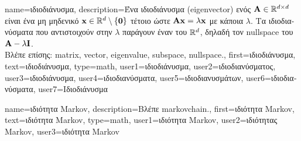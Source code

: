 {name={\foreignlanguage{greek}{ιδιοδιάνυσμα}}, 
	description={\foreignlanguage{greek}{Ένα ιδιοδιάνυσμα} (eigenvector) 
		\foreignlanguage{greek}{ενός}  ${\bf A} \in \mathbb{R}^{d \times d}$ 
		\foreignlanguage{greek}{είναι ένα μη μηδενικό}  ${\bf x} \in \mathbb{R}^{d} \setminus \{ \mathbf{0} \}$ 
		\foreignlanguage{greek}{τέτοιο ώστε $\mathbf{A} {\bf x} = \lambda {\bf x}$ με κάποια}  $\lambda$.
		\foreignlanguage{greek}{Τα ιδιοδιανύσματα που αντιστοιχούν στην}  $\lambda$ 
		\foreignlanguage{greek}{παράγουν έναν}  \foreignlanguage{greek}{του $\mathbb{R}^{d}$, δηλαδή τον} 
		\gls{nullspace} \foreignlanguage{greek}{του} ${\bf A}  - \lambda \mathbf{I}$.
		\\
		\foreignlanguage{greek}{Βλέπε επίσης:} \gls{matrix}, \gls{vector}, \gls{eigenvalue}, \gls{subspace}, \gls{nullspace}.},
	first={\foreignlanguage{greek}{ιδιοδιάνυσμα}},
	text={\foreignlanguage{greek}{ιδιοδιάνυσμα}},
	type=math,
	user1={\foreignlanguage{greek}{ιδιοδιάνυσμα}}, %
	user2={\foreignlanguage{greek}{ιδιοδιανύσματος}}, %
	user3={\foreignlanguage{greek}{ιδιοδιάνυσμα}}, %
	user4={\foreignlanguage{greek}{ιδιοδιανύσματα}}, %
	user5={\foreignlanguage{greek}{ιδιοδιανυσμάτων}}, %
	user6={\foreignlanguage{greek}{ιδιοδιανύσματα}}, %
	user7={\foreignlanguage{greek}{Ιδιοδιάνυσμα}} %
}

{name={\foreignlanguage{greek}{ιδιότητα} Markov},
	description={\foreignlanguage{greek}{Βλέπε} \gls{markovchain}.},
	first={\foreignlanguage{greek}{ιδιότητα} Markov},
	text={\foreignlanguage{greek}{ιδιότητα} Markov},
	type=math,
	user1={\foreignlanguage{greek}{ιδιότητα} Markov}, %
  	user2={\foreignlanguage{greek}{ιδιότητας} Markov}, %
	user3={\foreignlanguage{greek}{ιδιότητα} Markov} %
}

